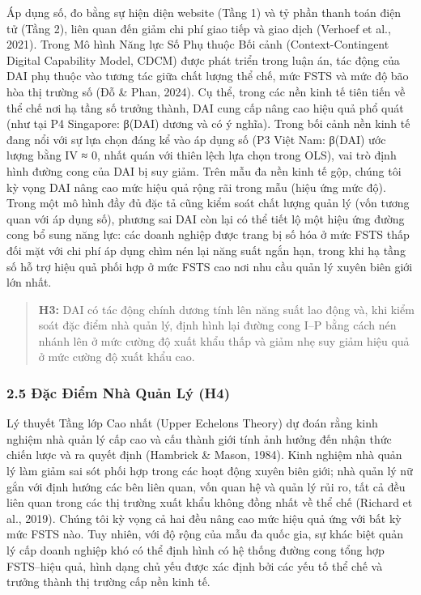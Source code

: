 \documentclass[12pt,a4paper]{article}
\begin{document}
Áp dụng số, đo bằng sự hiện diện website (Tầng 1) và tỷ phần thanh toán
điện tử (Tầng 2), liên quan đến giảm chi phí giao tiếp và giao dịch
(Verhoef et al., 2021). Trong Mô hình Năng lực Số Phụ thuộc Bối cảnh
(Context-Contingent Digital Capability Model, CDCM) được phát triển
trong luận án, tác động của DAI phụ thuộc vào tương tác giữa chất lượng
thể chế, mức FSTS và mức độ bão hòa thị trường số (Đỗ \& Phan, 2024). Cụ
thể, trong các nền kinh tế tiên tiến về thể chế nơi hạ tầng số trưởng
thành, DAI cung cấp nâng cao hiệu quả phổ quát (như tại P4 Singapore:
β(DAI) dương và có ý nghĩa). Trong bối cảnh nền kinh tế đang nổi với sự
lựa chọn đáng kể vào áp dụng số (P3 Việt Nam: β(DAI) ước lượng bằng IV ≈
0, nhất quán với thiên lệch lựa chọn trong OLS), vai trò định hình đường
cong của DAI bị suy giảm. Trên mẫu đa nền kinh tế gộp, chúng tôi kỳ vọng
DAI nâng cao mức hiệu quả rộng rãi trong mẫu (hiệu ứng mức độ). Trong
một mô hình đầy đủ đặc tả cũng kiểm soát chất lượng quản lý (vốn tương
quan với áp dụng số), phương sai DAI còn lại có thể tiết lộ một hiệu ứng
đường cong bổ sung năng lực: các doanh nghiệp được trang bị số hóa ở mức
FSTS thấp đối mặt với chi phí áp dụng chìm nén lại năng suất ngắn hạn,
trong khi hạ tầng số hỗ trợ hiệu quả phối hợp ở mức FSTS cao nơi nhu cầu
quản lý xuyên biên giới lớn nhất.

\begin{quote}
\textbf{H3:} DAI có tác động chính dương tính lên năng suất lao động và,
khi kiểm soát đặc điểm nhà quản lý, định hình lại đường cong I--P bằng
cách nén nhánh lên ở mức cường độ xuất khẩu thấp và giảm nhẹ suy giảm
hiệu quả ở mức cường độ xuất khẩu cao.
\end{quote}

\hypertarget{25-ux111ux1eb7c-ux111iux1ec3m-nhuxe0-quux1ea3n-luxfd-h4}{%
\subsubsection{2.5 Đặc Điểm Nhà Quản Lý
(H4)}\label{25-ux111ux1eb7c-ux111iux1ec3m-nhuxe0-quux1ea3n-luxfd-h4}}

Lý thuyết Tầng lớp Cao nhất (Upper Echelons Theory) dự đoán rằng kinh
nghiệm nhà quản lý cấp cao và cấu thành giới tính ảnh hưởng đến nhận
thức chiến lược và ra quyết định (Hambrick \& Mason, 1984). Kinh nghiệm
nhà quản lý làm giảm sai sót phối hợp trong các hoạt động xuyên biên
giới; nhà quản lý nữ gắn với định hướng các bên liên quan, vốn quan hệ
và quản lý rủi ro, tất cả đều liên quan trong các thị trường xuất khẩu
không đồng nhất về thể chế (Richard et al., 2019). Chúng tôi kỳ vọng cả
hai đều nâng cao mức hiệu quả ứng với bất kỳ mức FSTS nào. Tuy nhiên,
với độ rộng của mẫu đa quốc gia, sự khác biệt quản lý cấp doanh nghiệp
khó có thể định hình có hệ thống đường cong tổng hợp FSTS--hiệu quả,
hình dạng chủ yếu được xác định bởi các yếu tố thể chế và trưởng thành
thị trường cấp nền kinh tế.
\end{document}

